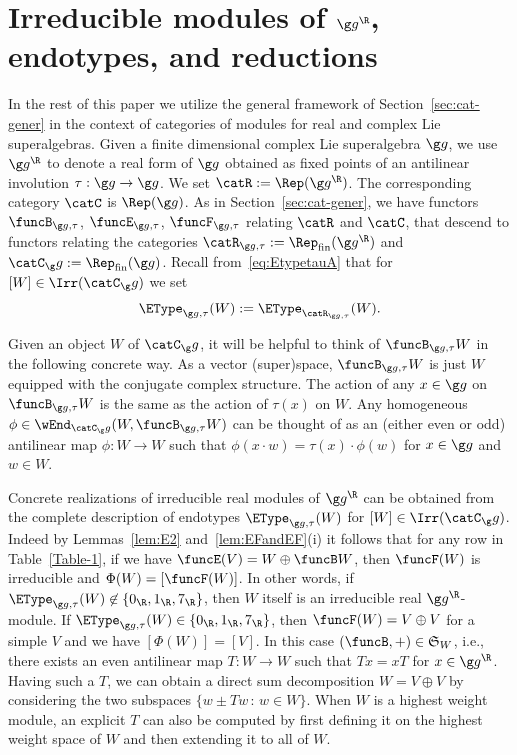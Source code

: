 \documentclass[12pt]{amsart}
\begin{document}
\section{Irreducible modules of $\g g^\R$, endotypes, and reductions}
\label{sec:reduction-E0}
In the rest of this paper we utilize the general framework of Section~\ref{sec:cat-gener} in the context of categories of modules for real and complex Lie superalgebras. 
Given a finite dimensional complex Lie superalgebra $\g g$, we use $\g g^\R$ to denote a real form of $\g g$ obtained as fixed points of an antilinear involution $\tau:\g g\to \g g$.
We set
$\catR:=
\Rep(\g g^\R)$. The corresponding category $\catC$ is 
$\Rep(\g g)$. 
As in Section~\ref{sec:cat-gener}, we have 
functors $\funcB_{\g g,\tau}$, $\funcE_{\g g,\tau}$, $\funcF_{\g g,\tau}$ relating  $\catR$ and $
\catC$, that  descend to functors relating the categories $\catR_{\g g,\tau}:=\Rep_\mathrm{fin}(\g g^\R)$ and $\catC_\g g:=\Rep_\mathrm{fin}(\g g)$. Recall from~\eqref{eq:EtypetauA} that for $[W]\in\Irr(\catC_\g g)$ we set
\[
\EType_{\g g,\tau}(W):=\EType_{\catR_{\g g,\tau}}^{}(W).
\]

\begin{rmk}
\label{remark:antilin-intertwiner}
Given an object $W$ of $\catC_\g g$, it will be helpful to think of $\funcB_{\g g,\tau}W$ in the following concrete way. As a vector (super)space, $\funcB_{\g g,\tau}W$ is just $W$ equipped with the conjugate complex structure. The action of any $x\in\g g$ on $\funcB_{\g g,\tau}W$ 
is the same as the action of $\tau(x)$ on $W$. 
Any homogeneous $\phi\in\wEnd_{\catC_\g g}(W,\funcB_{\g g,\tau}W)$ can be thought of as an (either even or odd) antilinear map $\phi:W\to W$ such that $\phi (x\cdot w)=\tau(x)\cdot \phi(w)$ for $x\in \g g$ and $w\in W$.
\end{rmk}


\begin{rmk}
\label{rmk:Endo-to-Class} Concrete realizations  of irreducible real modules of $\g g^\R$ can be obtained from the complete description of endotypes $\EType_{\g g,\tau}(W)$ for $[W]\in\Irr(\catC_\g g)$. Indeed by Lemmas~\ref{lem:E2} and~\ref{lem:EFandEF}(i) it follows that  for any row in Table~\ref{Table-1}, if we have $\funcE(V)=W\oplus \funcB W$,  then $\funcF(W)$ is irreducible and $\Phi(W)=[\funcF(W)]$. In other words, if $\EType_{\g g,\tau}(W)\not\in\{0_\R,1_\R,7_\R\}$, then $W$ itself is an irreducible real $\g g^\R$-module. 
If 
$\EType_{\g g,\tau}(W)\in\{0_\R, 1_\R,7_\R\}$,
  then $\funcF(W)=V\oplus V$ for a simple $V$ and we have $[\Phi(W)]=[V]$. In this case  $(\funcB,+)\in\mathfrak S_W$, i.e., there exists an even antilinear map $T:W\to W$ such that $Tx=xT$ for $x\in\g g^\R$. Having such a $T$, we can obtain a direct sum decomposition $W=V\oplus V$ by considering the two subspaces $\{w\pm Tw\,:\,w\in W\}$. When $W$ is a highest weight module, an explicit $T$ can also be computed by first defining it on the highest weight space of $W$ and then extending it to all of $W$.  
\end{rmk}
\end{document}
